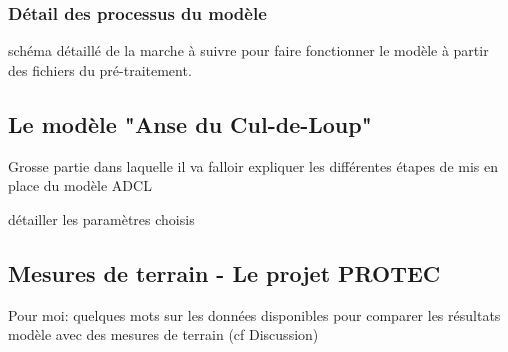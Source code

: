 \documentclass[10pt,a4paper,titlepage]{article}
\begin{document}
\subsubsection{Détail des processus du modèle}
schéma détaillé de la marche à suivre pour faire fonctionner le modèle à partir des fichiers du pré-traitement.

\subsection{Le modèle "Anse du Cul-de-Loup"}

Grosse partie dans laquelle il va falloir expliquer les différentes étapes de mis en place du modèle ADCL

détailler les paramètres choisis

\subsection{Mesures de terrain - Le projet PROTEC}

Pour moi: quelques mots sur les données disponibles pour comparer les résultats modèle avec des mesures de terrain (cf Discussion)
\end{document}
